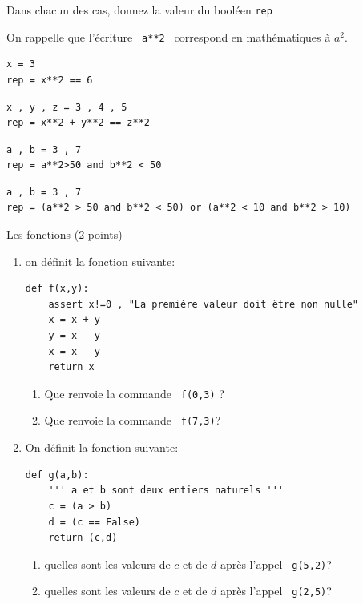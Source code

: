 \documentclass[a4paper,12pt,openany]{book}
\begin{document}
Dans chacun des cas, donnez la valeur du booléen \verb+rep+

	On rappelle que l'écriture \verb+ a**2 + correspond en mathématiques à $a^2$.

	\begin{lstlisting}
x = 3
rep = x**2 == 6
\end{lstlisting}

\bigskip

	\begin{lstlisting}
x , y , z = 3 , 4 , 5
rep = x**2 + y**2 == z**2
\end{lstlisting}

\bigskip

	\begin{lstlisting}
a , b = 3 , 7
rep = a**2>50 and b**2 < 50
\end{lstlisting}

\bigskip

	\begin{lstlisting}
a , b = 3 , 7
rep = (a**2 > 50 and b**2 < 50) or (a**2 < 10 and b**2 > 10)

\end{lstlisting}

\newpage


\exo \qquad Les fonctions \hfill
(2 points)

\begin{enumerate}
	\item on définit la fonction suivante:
	
\begin{lstlisting}
def f(x,y):
	assert x!=0 , "La première valeur doit être non nulle"
	x = x + y
	y = x - y
	x = x - y
	return x

\end{lstlisting}

	\begin{enumerate}
		\item Que renvoie la commande \verb+ f(0,3)+ ? \dotfill
		\item Que renvoie la commande \verb+ f(7,3)+? \dotfill
	\end{enumerate}

\medskip

\item On définit la fonction suivante:

\begin{lstlisting}
def g(a,b):
	''' a et b sont deux entiers naturels '''
	c = (a > b)
	d = (c == False)
	return (c,d)

\end{lstlisting}

\begin{enumerate}
	\item quelles sont les valeurs de $c$ et de $d$ après l'appel \verb+ g(5,2)+?\dotfill
	\item quelles sont les valeurs de $c$ et de $d$ après l'appel \verb+ g(2,5)+?\dotfill
\end{enumerate}
\end{enumerate}
\end{document}
